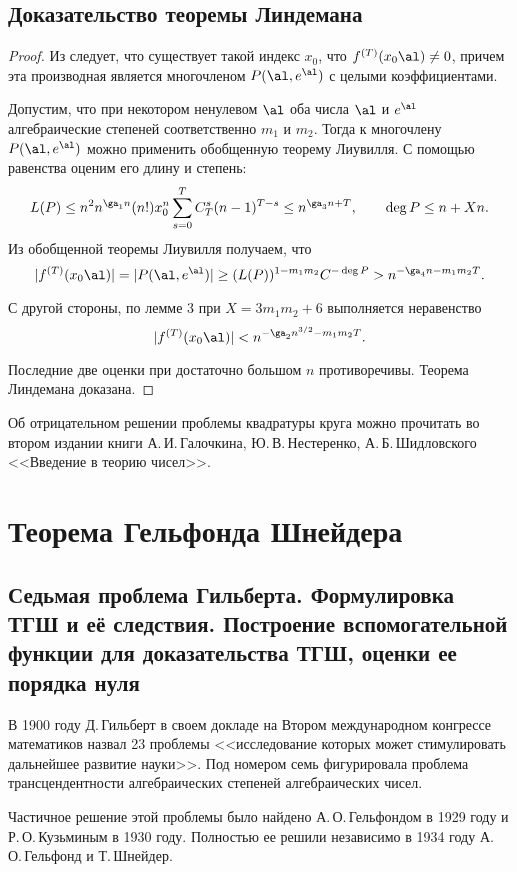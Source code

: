 \documentclass{article}
\begin{document}
\subsection{Доказательство теоремы Линдемана}

\begin{proof}
Из  следует, что существует
такой индекс $x_0$, что $f^{(T)}(x_0\al) \ne 0$, причем эта производная является
многочленом $P(\al,e^{\al})$ с целыми коэффициентами.

Допустим, что при некотором ненулевом
$\al$     оба числа $\al$  и $e^{\al}$  алгебраические степеней
соответственно $m_1$ и  $m_2$. Тогда
к многочлену $P(\al, e^{\al}) $ можно применить обобщенную теорему
Лиувилля. С помощью равенства  оценим его длину и степень:
$$
L(P) \le n^2n^{\ga_1n}(n!)x_0^n\sum_{s=0}^TC_T^s(n-1)^{T-s} \le
n^{\ga_3n+T}, \qquad \deg P \le n+Xn.
$$
Из обобщенной теоремы Лиувилля получаем, что
$$
|f^{(T)}(x_0\al)|=|P(\al, e^{\al})|\ge (L(P))^{1-m_1m_2}C^{-\deg P} >
n^{-\ga_4n-m_1m_2T}.
$$

С другой стороны, по лемме 3 при $X=3m_1m_2+6$ выполняется неравенство
$$
|f^{(T)}(x_0\al)| <n^{-\ga_2n^{3/2}-m_1m_2T}.
$$

Последние две оценки при достаточно большом $n$ противоречивы. Теорема
Линдемана  доказана.
\end{proof}

Об отрицательном решении проблемы квадратуры круга можно прочитать во
втором издании книги А.\,И.\,Га\-лочкина, Ю.\,В.\,Нестеренко, А.\,Б.\,Шидловского
<<Введение в теорию чисел>>.

\section{Теорема Гельфонда Шнейдера}

\subsection{Седьмая проблема Гильберта. Формулировка ТГШ и её следствия.
Построение вспомогательной функции для доказательства ТГШ, оценки ее порядка нуля}

В 1900 году Д.\,Гильберт в своем докладе на Втором международном конгрессе
математиков назвал 23 проблемы <<исследование которых может стимулировать
дальнейшее развитие науки>>. Под номером семь фигурировала проблема
трансцендентности алгебраических степеней алгебраических чисел.

Частичное решение этой проблемы было найдено А.\,О.\,Гельфондом в 1929 году и
Р.\,О.\,Кузьминым в 1930 году. Полностью ее решили независимо в 1934 году
А.\,О.\,Гельфонд и Т.\,Шнейдер.
\end{document}
